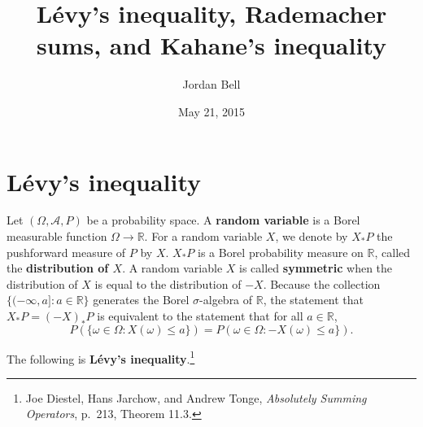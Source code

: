 \documentclass{article}
\theoremstyle{definition}
\begin{document}
\title{Lévy's inequality, Rademacher sums,  and Kahane's inequality}
\author{Jordan Bell}
\date{May 21, 2015}

\maketitle

\section{Lévy's inequality}
Let $(\Omega,\mathscr{A},P)$ be a probability space.
A \textbf{random variable} is a Borel measurable function $\Omega \to \mathbb{R}$. 
For a random variable $X$, we denote by 
$X_*P$ the pushforward measure of $P$ by $X$. $X_*P$ is a Borel probability measure on $\mathbb{R}$, called
the \textbf{distribution of $X$}.
A random variable $X$ is called \textbf{symmetric} when
the distribution of $X$ is equal to the distribution of $-X$.
Because the collection $\{(-\infty,a]: a \in \mathbb{R}\}$ generates the Borel $\sigma$-algebra of $\mathbb{R}$,
the statement that $X_*P=(-X)_*P$ is equivalent to the statement that for all $a \in \mathbb{R}$,
\[
P(\{\omega \in \Omega: X(\omega) \leq a\})=P(\omega \in \Omega: -X(\omega) \leq a\}).
\]

The following is \textbf{L\'evy's inequality}.\footnote{Joe Diestel, Hans Jarchow, and Andrew Tonge, {\em Absolutely Summing Operators},
p.~213, Theorem 11.3.}
\end{document}
